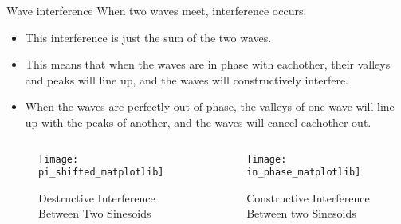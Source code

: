 \documentclass[aspectratio=169]{beamer}
\begin{document}
				
\begin{frame}{Wave interference}
	When two waves meet, interference occurs.
	\begin{itemize}
		\item This interference is just the sum of the two waves.
		\item This means that when the waves are in phase with eachother, their valleys and peaks will line up, and the waves will constructively interfere.
		\item When the waves are perfectly out of phase, the valleys of one wave will line up with the peaks of another, and the waves will cancel eachother out.
	\end{itemize}
							
								
	\begin{columns}[c]	
		\begin{column}{.5\textwidth}
			\begin{figure}
				\texttt{[image: pi\_shifted\_matplotlib]}
				\caption{Destructive Interference Between Two Sinesoids}
			\end{figure}
		\end{column}
											
										
											
		\begin{column}{.5\textwidth}
			\begin{figure}
				\texttt{[image: in\_phase\_matplotlib]}
				\caption{Constructive Interference Between two Sinesoids}
			\end{figure}
		\end{column}
	\end{columns}
							
\end{frame}
				
\end{document}
